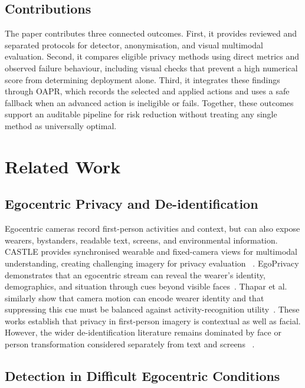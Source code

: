\documentclass[10pt,twocolumn]{IEEEtran}
\begin{document}
\subsection{Contributions}

The paper contributes three connected outcomes. First, it provides reviewed and
separated protocols for detector, anonymisation, and visual multimodal
evaluation. Second, it compares eligible privacy methods using direct metrics
and observed failure behaviour, including visual checks that prevent a high
numerical score from determining deployment alone. Third, it integrates these
findings through OAPR, which records the selected and applied actions and uses a
safe fallback when an advanced action is ineligible or fails. Together, these
outcomes support an auditable pipeline for risk reduction without treating any
single method as universally optimal.

\section{Related Work}
\label{sec:related-work}

\subsection{Egocentric Privacy and De-identification}

Egocentric cameras record first-person activities and context, but can also
expose wearers, bystanders, readable text, screens, and environmental information.
CASTLE provides synchronised wearable and fixed-camera views for multimodal
understanding, creating challenging imagery for privacy evaluation
~\cite{rossetto2025castle}. EgoPrivacy demonstrates that an
egocentric stream can reveal the wearer's identity, demographics, and situation
through cues beyond visible faces~\cite{li2025egoprivacy}. Thapar et al. similarly
show that camera motion can encode wearer identity and that suppressing this cue
must be balanced against activity-recognition utility~\cite{thapar2021anonymizing}.
These works establish that privacy in first-person imagery is contextual as well
as facial. However, the wider de-identification literature remains dominated by
face or person transformation considered separately from text and screens
~\cite{khan2025persondeid}.

\subsection{Detection in Difficult Egocentric Conditions}
\end{document}
